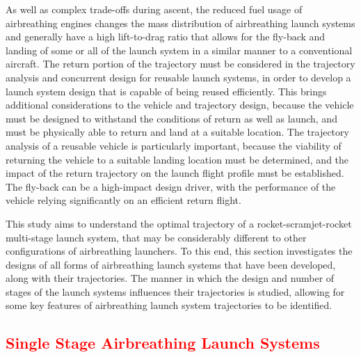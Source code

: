 As well as complex trade-offs during ascent, the reduced fuel usage of airbreathing engines changes the mass distribution of airbreathing launch systems and generally have a high lift-to-drag ratio that allows for the fly-back and landing of some or all of the launch system in a similar manner to a conventional aircraft\cite{Preller2017b}. The return portion of the trajectory must be considered in the trajectory analysis and concurrent design for reusable launch systems, in order to develop a launch system design that is capable of being reused efficiently\cite{Hellman}. This brings additional considerations to the vehicle and trajectory design, because the vehicle must be designed to withstand the conditions of return as well as launch, and must be physically able to return and land at a suitable location\cite{Hellman}. The trajectory analysis of a reusable vehicle is particularly important, because the viability of returning the vehicle to a suitable landing location must be determined, and the impact of the return trajectory on the launch flight profile must be established. The fly-back can be a high-impact design driver, with the performance of the vehicle relying significantly on an efficient return flight\cite{Tetlow1992,Hellman}. 

This study aims to understand the optimal trajectory of a rocket-scramjet-rocket multi-stage launch system, that may be considerably different to other configurations of airbreathing launchers. 
To this end, this section investigates the designs of all forms of airbreathing launch systems that have been developed, along with their trajectories. The manner in which the design and number of stages of the launch systems influences their trajectories is studied, allowing for some key features of airbreathing launch system trajectories to be identified.
  
 
  
  
  
  
  
  
 
  
  
 \textcolor{red}{
  \subsection{Single Stage Airbreathing Launch Systems}
}

